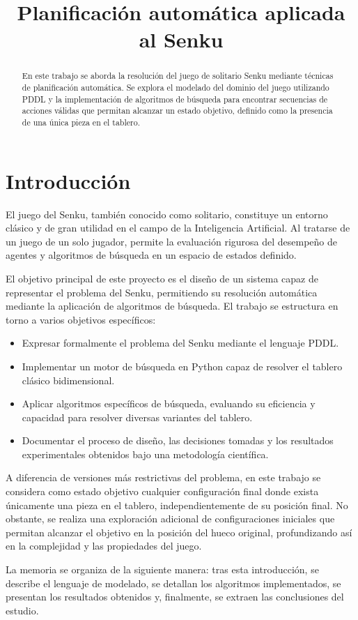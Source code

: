 \documentclass[conference]{IEEEtran}
\title{Planificación automática aplicada al Senku}
\author{\IEEEauthorblockN{Gregorio Morillo Zamora | Raúl Jimenez Pérez}
\IEEEauthorblockA{\textit{Inteligencia Artificial - Ingeniería Informática. Ingeniería del Software} \\
Curso 2025/2026}
}
\begin{document}
\maketitle

\begin{abstract}
En este trabajo se aborda la resolución del juego de solitario Senku mediante técnicas de planificación automática. Se explora el modelado del dominio del juego utilizando PDDL y la implementación de algoritmos de búsqueda para encontrar secuencias de acciones válidas que permitan alcanzar un estado objetivo, definido como la presencia de una única pieza en el tablero.
\end{abstract}

\section{Introducción}
El juego del Senku, también conocido como solitario, constituye un entorno clásico y de gran utilidad en el campo de la Inteligencia Artificial. Al tratarse de un juego de un solo jugador, permite la evaluación rigurosa del desempeño de agentes y algoritmos de búsqueda en un espacio de estados definido.

El objetivo principal de este proyecto es el diseño de un sistema capaz de representar el problema del Senku, permitiendo su resolución automática mediante la aplicación de algoritmos de búsqueda. El trabajo se estructura en torno a varios objetivos específicos:
\begin{itemize}
    \item Expresar formalmente el problema del Senku mediante el lenguaje PDDL.
    \item Implementar un motor de búsqueda en Python capaz de resolver el tablero clásico bidimensional.
    \item Aplicar algoritmos específicos de búsqueda, evaluando su eficiencia y capacidad para resolver diversas variantes del tablero.
    \item Documentar el proceso de diseño, las decisiones tomadas y los resultados experimentales obtenidos bajo una metodología científica.
\end{itemize}

A diferencia de versiones más restrictivas del problema, en este trabajo se considera como estado objetivo cualquier configuración final donde exista únicamente una pieza en el tablero, independientemente de su posición final. No obstante, se realiza una exploración adicional de configuraciones iniciales que permitan alcanzar el objetivo en la posición del hueco original, profundizando así en la complejidad y las propiedades del juego.

La memoria se organiza de la siguiente manera: tras esta introducción, se describe el lenguaje de modelado, se detallan los algoritmos implementados, se presentan los resultados obtenidos y, finalmente, se extraen las conclusiones del estudio.
\end{document}
